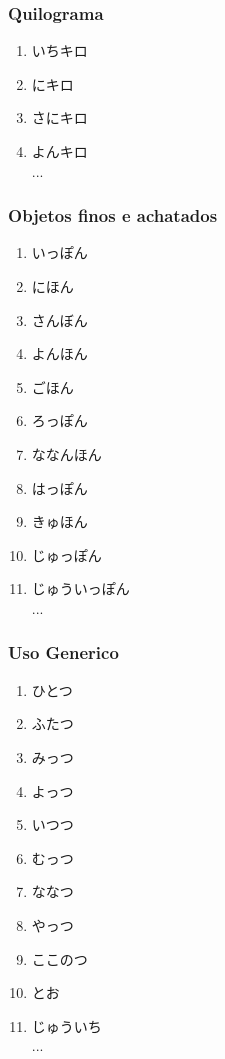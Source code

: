 \documentclass[a4paper, 12pt]{article}
\begin{document}
\subsubsection{Quilograma}
\begin{CJK}{UTF8}{min}
	\begin{enumerate}
		\item いちキロ
		\item にキロ
		\item さにキロ
		\item よんキロ\\...
	\end{enumerate}	
\end{CJK}

\subsubsection{Objetos finos e achatados}
\begin{CJK}{UTF8}{min}
	\begin{enumerate}
		\item いっぽん
		\item にほん
		\item さんぼん
		\item よんほん
		\item ごほん
		\item ろっぽん
		\item ななんほん
		\item はっぽん
		\item きゅほん
		\item じゅっぽん
		\item じゅういっぽん\\...
	\end{enumerate}	
\end{CJK}

\subsubsection{Uso Generico}
\begin{CJK}{UTF8}{min}
	\begin{enumerate}
		\item ひとつ
		\item ふたつ
		\item みっつ
		\item よっつ
		\item いつつ
		\item むっつ
		\item ななつ
		\item やっつ
		\item ここのつ
		\item とお
		\item じゅういち\\...
	\end{enumerate}	
\end{CJK}
\end{document}
